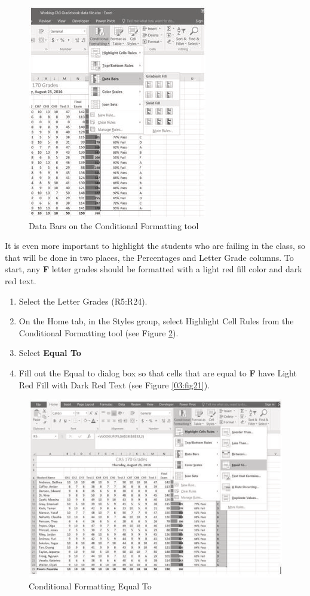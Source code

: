 \begin{figure}[H]
	\centering
	\includegraphics[width=\maxwidth{.95\linewidth}]{gfx/ch03_fig19}
	\caption{Data Bars on the Conditional Formatting tool}
	\label{03:fig19}
\end{figure}

It is even more important to highlight the students who are failing in the class, so that will be done in two places, the Percentages and Letter Grade columns. To start, any \textbf{F} letter grades should be formatted with a light red fill color and dark red text.

\begin{enumerate}
	\item Select the Letter Grades (\textsf{R5:R24}).
	\item On the Home tab, in the Styles group, select Highlight Cell Rules from the Conditional Formatting tool (see Figure \ref{03:fig20}).
	\item Select \textbf{Equal To}
	\item Fill out the Equal to dialog box so that cells that are equal to \textbf{F} have Light Red Fill with Dark Red Text (see Figure \ref{03:fig21}).
\end{enumerate}

\begin{figure}[H]
	\centering
	\includegraphics[width=\maxwidth{.95\linewidth}]{gfx/ch03_fig20}
	\caption{Conditional Formatting Equal To}
	\label{03:fig20}
\end{figure}

